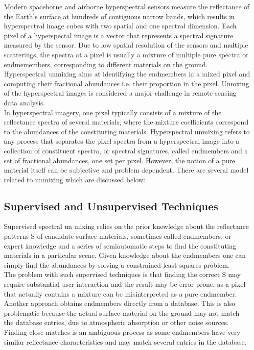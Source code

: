 \documentclass[12pt]{svproc}
\begin{document}
Modern spaceborne and airborne hyperspectral sensors measure the reflectance of the Earth's surface at hundreds of contiguous narrow bands, which results in hyperspectral image cubes with two spatial and one spectral dimension. Each pixel of a hyperspectal image is a vector that represents a spectral signature measured by the sensor. Due to low spatial resolution of the sensors and multiple scatterings, the spectra at a pixel is usually a mixture of multiple pure spectra or endmemembers, corresponding to different materials on the ground. Hyperspectral unmixing aims at identifying the endmembers in a mixed pixel and computing their fractional abundances i.e. their proportion in the pixel. Unmxing of the hyperspectral images is considered a major challenge in remote sensing data analysis.\\

In hyperspectral imagery, one pixel typically consists of a mixture of the reflectance spectra of several materials, where the mixture coefficients correspond to the abundances of the constituting materials.
Hyperspectral unmixing refers to any process that separates the pixel spectra from a hyperspectral image into a collection of constituent spectra, or spectral signatures, called endmembers and a set of fractional abundances, one set per pixel. 
However, the notion of a pure material itself can be subjective and problem dependent.
There are several model related to unmixing which are discussed below:
\subsection{Supervised and Unsupervised Techniques}
Supervised spectral un mixing relies on the prior knowledge about the reflectance patterns S of candidate surface materials, sometimes called endmembers, or expert knowledge and a series of semiautomatic steps to find the constituting materials in a particular scene. Given knowledge about the endmembers one can simply find the abundances by solving a constrained least squares problem.\\

The problem with such supervised techniques is that finding the correct S may require substantial user interaction and the result may be error prone, as a pixel that actually contains a mixture can be misinterpreted as a pure endmember. Another approach obtains endmembers directly from a database. This is also problematic because the actual surface material on the ground may not match the database entries, due to atmospheric absorption or other noise sources. Finding close matches is an ambiguous process as some endmembers have very similar reflectance characteristics and may match several entries in the database.
\end{document}
